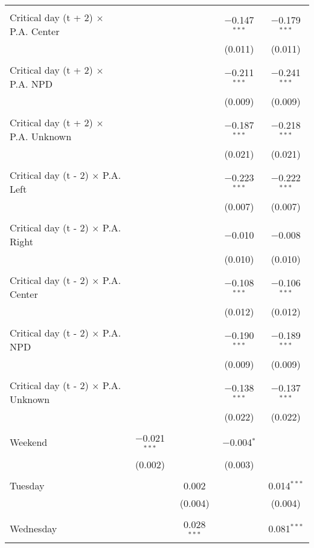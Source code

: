 \documentclass[
]{article}
\begin{document}
\begin{table}[!htbp]
{\begin{tabular}{@{\extracolsep{5pt}}lcccc}
  & & & & \\ 
 Critical day (t + 2) $\times$ P.A. Center &  &  & $-$0.147$^{***}$ & $-$0.179$^{***}$ \\ 
  &  &  & (0.011) & (0.011) \\ 
  & & & & \\ 
 Critical day (t + 2) $\times$ P.A. NPD &  &  & $-$0.211$^{***}$ & $-$0.241$^{***}$ \\ 
  &  &  & (0.009) & (0.009) \\ 
  & & & & \\ 
 Critical day (t + 2) $\times$ P.A. Unknown &  &  & $-$0.187$^{***}$ & $-$0.218$^{***}$ \\ 
  &  &  & (0.021) & (0.021) \\ 
  & & & & \\ 
 Critical day (t - 2) $\times$ P.A. Left &  &  & $-$0.223$^{***}$ & $-$0.222$^{***}$ \\ 
  &  &  & (0.007) & (0.007) \\ 
  & & & & \\ 
 Critical day (t - 2) $\times$ P.A. Right &  &  & $-$0.010 & $-$0.008 \\ 
  &  &  & (0.010) & (0.010) \\ 
  & & & & \\ 
 Critical day (t - 2) $\times$ P.A. Center &  &  & $-$0.108$^{***}$ & $-$0.106$^{***}$ \\ 
  &  &  & (0.012) & (0.012) \\ 
  & & & & \\ 
 Critical day (t - 2) $\times$ P.A. NPD &  &  & $-$0.190$^{***}$ & $-$0.189$^{***}$ \\ 
  &  &  & (0.009) & (0.009) \\ 
  & & & & \\ 
 Critical day (t - 2) $\times$ P.A. Unknown &  &  & $-$0.138$^{***}$ & $-$0.137$^{***}$ \\ 
  &  &  & (0.022) & (0.022) \\ 
  & & & & \\ 
 Weekend & $-$0.021$^{***}$ &  & $-$0.004$^{*}$ &  \\ 
  & (0.002) &  & (0.003) &  \\ 
  & & & & \\ 
 Tuesday &  & 0.002 &  & 0.014$^{***}$ \\ 
  &  & (0.004) &  & (0.004) \\ 
  & & & & \\ 
 Wednesday &  & 0.028$^{***}$ &  & 0.081$^{***}$ \\ 

\end{tabular}}
\end{table}
\end{document}
